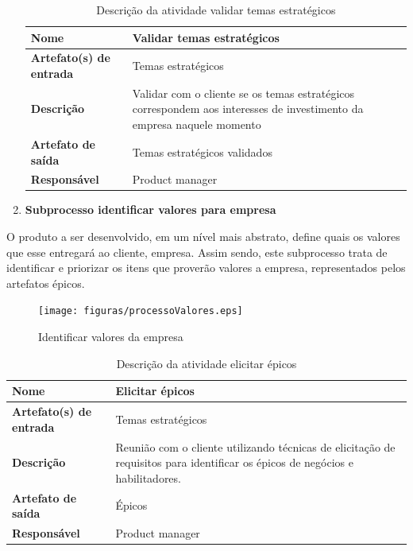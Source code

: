 \begin{enumerate}
\begin{table}[H]
    \centering
    \label{descricaoAtividades2}
    \caption{Descrição da atividade validar temas estratégicos}
        \begin{tabular}{|l|p{10cm}|}
        \hline
        \textbf{Nome} & Validar temas estratégicos \\
        \hline
        \textbf{Artefato(s) de entrada} & Temas estratégicos \\
        \hline
        \textbf{Descrição} & Validar com o cliente se os temas estratégicos correspondem aos interesses de investimento da empresa naquele momento \\
        \hline
        \textbf{Artefato de saída} & Temas estratégicos validados \\
        \hline
        \textbf{Responsável} & Product manager\\
        \hline
    \end{tabular}
\end{table}

\item \textbf{Subprocesso identificar valores para empresa}
\end{enumerate}
O produto a ser desenvolvido, em um nível mais abstrato, define quais os valores que esse entregará ao cliente, empresa. Assim sendo, este subprocesso trata de identificar e priorizar os itens que proverão valores a empresa, representados pelos artefatos épicos.

\begin{figure}[H]
    \centering
    \caption{Identificar valores da empresa}
    \label{processoValores}
    \texttt{[image: figuras/processoValores.eps]}
\end{figure}

\begin{table}[H]
    \centering
    \label{descricaoAtividades3}
    \caption{Descrição da atividade elicitar épicos} 
        \begin{tabular}{|l|p{10cm}|}
        \hline
        \textbf{Nome} & Elicitar épicos \\
        \hline
        \textbf{Artefato(s) de entrada} & Temas estratégicos \\
        \hline
        \textbf{Descrição} & Reunião com o cliente utilizando técnicas de elicitação de requisitos para identificar os épicos de negócios e habilitadores. \\
        \hline
        \textbf{Artefato de saída} & Épicos \\
        \hline
        \textbf{Responsável} & Product manager \\
        \hline
    \end{tabular}
\end{table}

